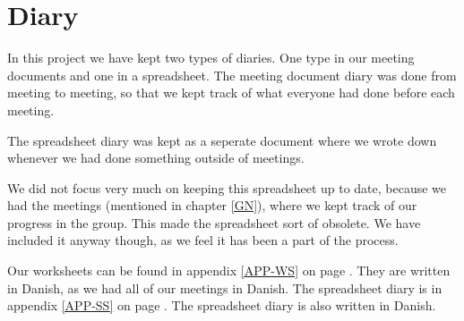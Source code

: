\chapter{Diary}
In this project we have kept two types of diaries. One type in our meeting
documents and one in a spreadsheet. The meeting document diary was done from
meeting to meeting, so that we kept track of what everyone had done before each
meeting.

The spreadsheet diary was kept as a seperate document where we wrote down
whenever we had done something outside of meetings. 

We did not focus very much on keeping this spreadsheet up to date, because we
had the meetings (mentioned in chapter \ref{GN}), where we kept track of our
progress in the group. This made the spreadsheet sort of obsolete. We have
included it anyway though, as we feel it has been a part of the process.

Our worksheets can be found in appendix \ref{APP-WS} on page \pageref{APP-WS}.
They are written in Danish, as we had all of our meetings in Danish. The spreadsheet
diary is in appendix \ref{APP-SS}  on page
\pageref{APP-SS}. The spreadsheet diary is also written in Danish.